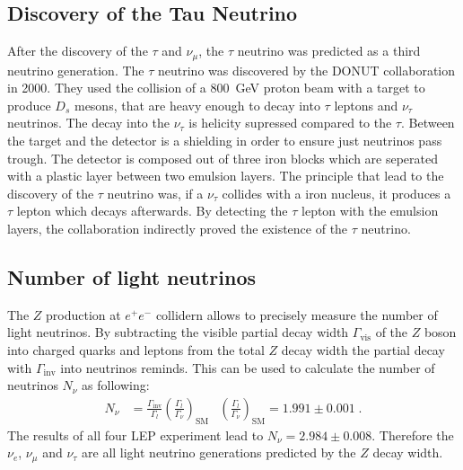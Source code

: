 \subsection{Discovery of the Tau Neutrino}
After the discovery of the $\tau$ and $\nu_{\mu}$, the $\tau$ neutrino was predicted as a third neutrino generation. The $\tau$ neutrino was discovered by the DONUT collaboration in 2000. They used the collision of a \SI{800}{\giga\electronvolt} proton beam with a target to produce $D_s$ mesons, that are heavy enough to decay into $\tau$ leptons and $\nu_{\tau}$ neutrinos. The decay into the $\nu_{\tau}$ is helicity supressed compared to the $\tau$. Between the target and the detector is a shielding in order to ensure just neutrinos pass trough.
The detector is composed out of three iron blocks which are seperated with a plastic layer between two emulsion layers. The principle that lead to the discovery of the $\tau$ neutrino was, if a $\nu_{\tau}$ collides with a iron nucleus, it produces a $\tau$ lepton which decays afterwards. By detecting the $\tau$ lepton with the emulsion layers, the collaboration indirectly proved the existence of the $\tau$ neutrino.
\subsection{Number of light neutrinos}
The $Z$ production at $e^+e^-$ collidern allows to precisely measure the number of light neutrinos. By subtracting the visible partial decay width $\Gamma_{\text{vis}}$ of the $Z$ boson into charged quarks and leptons from the total $Z$ decay width the partial decay with $\Gamma_{\text{inv}}$ into neutrinos reminds. This can be used to calculate the number of neutrinos $N_{\nu}$ as following:
\begin{align*}
	N_{\nu} &= \frac{\Gamma_{\text{inv}}}{\Gamma_{l}} \left( \frac{\Gamma_l}{\Gamma_{\nu}}\right)_{\text{SM}} & \left( \frac{\Gamma_l}{\Gamma_{\nu}}\right)_{\text{SM}} = 1.991 \pm 0.001 \; .
\end{align*}
The results of all four LEP experiment lead to $N_{\nu} = 2.984 \pm 0.008$. Therefore the $\nu_{e}$, $\nu_{\mu}$ and $\nu_{\tau}$ are all light neutrino generations predicted by the $Z$ decay width.
